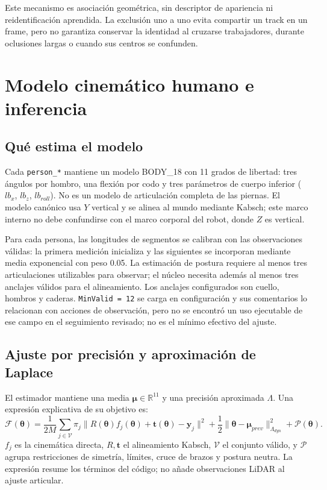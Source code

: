 \documentclass[11pt,a4paper]{article}
\newcommand{\code}[1]{\nolinkurl{#1}}
\newcommand{\R}{\mathbb{R}}
\begin{document}
Este mecanismo es asociación geométrica, sin descriptor de apariencia ni
reidentificación aprendida. La exclusión uno a uno evita compartir un track en un
frame, pero no garantiza conservar la identidad al cruzarse trabajadores, durante
oclusiones largas o cuando sus centros se confunden.~\cite{skeletonsource}

\section{Modelo cinemático humano e inferencia}

\subsection{Qué estima el modelo}
Cada \code{person_*} mantiene un modelo BODY\_18 con 11 grados de libertad: tres
ángulos por hombro, una flexión por codo y tres parámetros de cuerpo inferior
($lb_x$, $lb_z$, $lb_{roll}$). No es un modelo de articulación completa de las piernas.
El modelo canónico usa $Y$ vertical y se alinea al mundo mediante Kabsch; este marco
interno no debe confundirse con el marco corporal del robot, donde $Z$ es vertical.
\cite{kinematic}

Para cada persona, las longitudes de segmentos se calibran con las observaciones
válidas: la primera medición inicializa y las siguientes se incorporan mediante
media exponencial con peso 0.05. La estimación de postura requiere al menos tres
articulaciones utilizables para observar; el núcleo necesita además al menos tres
anclajes válidos para el alineamiento. Los anclajes configurados son cuello,
hombros y caderas. \code{MinValid = 12} se carga en configuración y sus comentarios
lo relacionan con acciones de observación, pero no se encontró un uso ejecutable de
ese campo en el seguimiento revisado; no es el mínimo efectivo del ajuste.
\cite{humanfitter,humanconfig,vfe}

\subsection{Ajuste por precisión y aproximación de Laplace}
El estimador mantiene una media $\bm{\mu}\in\R^{11}$ y una precisión aproximada
$\Lambda$. Una expresión explicativa de su objetivo es:
\begin{equation}
 \mathcal{F}(\bm{\theta})=
 \frac{1}{2M}\sum_{j\in\mathcal{V}}\pi_j
 \|R(\bm{\theta})f_j(\bm{\theta})+\bm{t}(\bm{\theta})-\bm{y}_j\|^2
 +\frac{1}{2}\|\bm{\theta}-\bm{\mu}_{prev}\|^2_{\Lambda_{dyn}}
 +\mathcal{P}(\bm{\theta}).
\end{equation}
$f_j$ es la cinemática directa, $R,\bm{t}$ el alineamiento Kabsch, $\mathcal{V}$ el
conjunto válido, y $\mathcal{P}$ agrupa restricciones de simetría, límites, cruce de
brazos y postura neutra. La expresión resume los términos del código; no añade
observaciones LiDAR al ajuste articular.~\cite{vfe}
\end{document}

